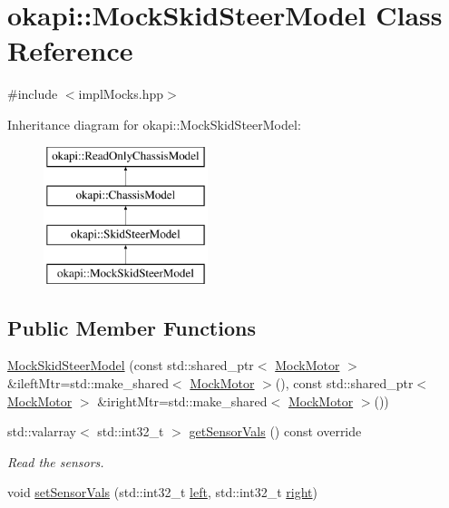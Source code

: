\hypertarget{classokapi_1_1MockSkidSteerModel}{}\section{okapi\+::Mock\+Skid\+Steer\+Model Class Reference}
\label{classokapi_1_1MockSkidSteerModel}


{\ttfamily \#include $<$impl\+Mocks.\+hpp$>$}

Inheritance diagram for okapi\+::Mock\+Skid\+Steer\+Model\+:\begin{figure}[H]
\begin{center}
\leavevmode
\includegraphics[height=4.000000cm]{classokapi_1_1MockSkidSteerModel}
\end{center}
\end{figure}
\subsection*{Public Member Functions}
\begin{DoxyCompactItemize}
\item 
\mbox{\hyperlink{classokapi_1_1MockSkidSteerModel_a42eb4fb195a806a3876f6bf9a051ca1b}{Mock\+Skid\+Steer\+Model}} (const std\+::shared\+\_\+ptr$<$ \mbox{\hyperlink{classokapi_1_1MockMotor}{Mock\+Motor}} $>$ \&ileft\+Mtr=std\+::make\+\_\+shared$<$ \mbox{\hyperlink{classokapi_1_1MockMotor}{Mock\+Motor}} $>$(), const std\+::shared\+\_\+ptr$<$ \mbox{\hyperlink{classokapi_1_1MockMotor}{Mock\+Motor}} $>$ \&iright\+Mtr=std\+::make\+\_\+shared$<$ \mbox{\hyperlink{classokapi_1_1MockMotor}{Mock\+Motor}} $>$())
\item 
std\+::valarray$<$ std\+::int32\+\_\+t $>$ \mbox{\hyperlink{classokapi_1_1MockSkidSteerModel_a460cd78aeee4fb1c8eee0113de84075a}{get\+Sensor\+Vals}} () const override
\begin{DoxyCompactList}\small\item\em Read the sensors. \end{DoxyCompactList}\item 
void \mbox{\hyperlink{classokapi_1_1MockSkidSteerModel_ab3790520e913c3d720f6cae0b99ff6e2}{set\+Sensor\+Vals}} (std\+::int32\+\_\+t \mbox{\hyperlink{classokapi_1_1SkidSteerModel_af2b00108853b82eb0fb5ecb3b71f413d}{left}}, std\+::int32\+\_\+t \mbox{\hyperlink{classokapi_1_1SkidSteerModel_ada9bd222b5aeaa0507b57906ac59dd3b}{right}})
\end{DoxyCompactItemize}
